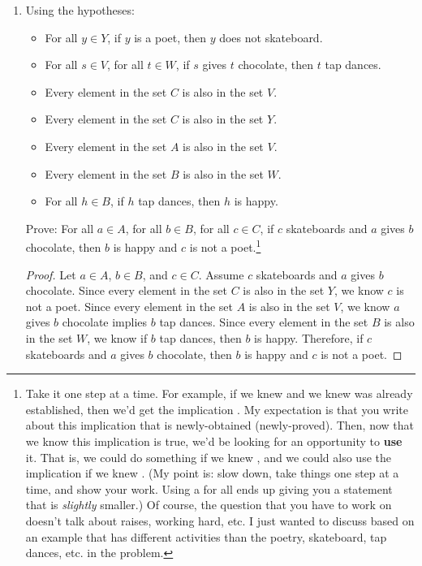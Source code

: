 \documentclass{article}
\begin{document}
\begin{enumerate}
          \newpage

    \item Using the hypotheses:

          \begin{itemize}
              \item For all $y \in Y$, if $y$ is a poet, then $y$ does not skateboard.
              \item For all $s \in V$, for all $t \in W$, if $s$ gives $t$ chocolate, then $t$ tap
                    dances.
              \item Every element in the set $C$ is also in the set $V$.
              \item Every element in the set $C$ is also in the set $Y$.
              \item Every element in the set $A$ is also in the set $V$.
              \item Every element in the set $B$ is also in the set $W$.
              \item For all $h \in B$, if $h$ tap dances, then $h$ is happy.
          \end{itemize}
          Prove: For all $a \in A$, for all $b \in B$, for all $c \in C$, if $c$ skateboards and $a$ gives $b$ chocolate, then $b$ is happy and $c$ is not a poet.\footnote{Take it one step at a time. For example, if we knew  and we knew  was already established, then we'd get the implication . My expectation is that you write about this implication that is newly-obtained (newly-proved). Then, now that we know this implication is true, we'd be looking for an opportunity to {\bf use} it. That is, we could do something if we knew , and we could also use the implication if we knew . (My point is: slow down, take things one step at a time, and show your work. Using a for all ends up giving you a statement that is \emph{slightly} smaller.) Of course, the question that you have to work on doesn't talk about raises, working hard, etc. I just wanted to discuss based on an example that has different activities than the poetry, skateboard, tap dances, etc. in the problem.}

          \begin{proof}
              Let $a \in A$, $b \in B$, and $c \in C$. Assume $c$ skateboards and $a$ gives $b$ chocolate.
              Since every element in the set $C$ is also in the set $Y$, we know $c$ is not a poet.
              Since every element in the set $A$ is also in the set $V$, we know $a$ gives $b$ chocolate implies $b$ tap dances.
              Since every element in the set $B$ is also in the set $W$, we know if $b$ tap dances, then $b$ is happy.
              Therefore, if $c$ skateboards and $a$ gives $b$ chocolate, then $b$ is happy and $c$ is not a poet.
          \end{proof}


\end{enumerate}
\end{document}
